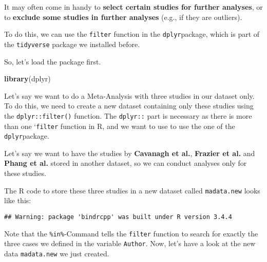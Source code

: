 \documentclass[]{book}
\newenvironment{Shaded}{\begin{snugshade}}{\end{snugshade}}
\newcommand{\KeywordTok}[1]{\textcolor[rgb]{0.13,0.29,0.53}{\textbf{#1}}}
\newcommand{\StringTok}[1]{\textcolor[rgb]{0.31,0.60,0.02}{#1}}
\newcommand{\OperatorTok}[1]{\textcolor[rgb]{0.81,0.36,0.00}{\textbf{#1}}}
\newcommand{\NormalTok}[1]{#1}
\theoremstyle{definition}
\theoremstyle{definition}
\theoremstyle{definition}
\theoremstyle{remark}
\begin{document}
It may often come in handy to \textbf{select certain studies for further
analyses}, or to \textbf{exclude some studies in further analyses}
(e.g., if they are outliers).

To do this, we can use the \texttt{filter} function in the
\texttt{dplyr}package, which is part of the \texttt{tidyverse} package
we installed before.

So, let's load the package first.

\begin{Shaded}
\begin{Highlighting}[]
\KeywordTok{library}\NormalTok{(dplyr)}
\end{Highlighting}
\end{Shaded}

Let's say we want to do a Meta-Analysis with three studies in our
dataset only. To do this, we need to create a new dataset containing
only these studies using the \texttt{dplyr::filter()} function. The
\texttt{dplyr::} part is necessary as there is more than one
`\texttt{filter} function in R, and we want to use to use the one of the
\texttt{dplyr}package.

Let's say we want to have the studies by \textbf{Cavanagh et al.},
\textbf{Frazier et al.} and \textbf{Phang et al.} stored in another
dataset, so we can conduct analyses only for these studies.

The R code to store these three studies in a new dataset called
\texttt{madata.new} looks like this:

\begin{Shaded}
\end{Shaded}

\begin{verbatim}
## Warning: package 'bindrcpp' was built under R version 3.4.4
\end{verbatim}

Note that the \texttt{\%in\%}-Command tells the \texttt{filter} function
to search for exactly the three cases we defined in the variable
\texttt{Author}. Now, let's have a look at the new data
\texttt{madata.new} we just created.
\end{document}
